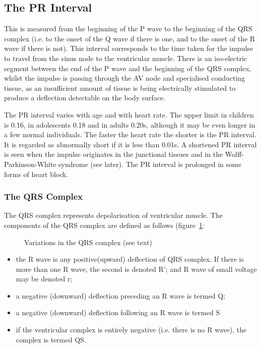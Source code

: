 \subsection{The PR Interval}
This is measured from the beginning of the P wave to the beginning of the QRS
complex (i.e. to the onset of the Q wave if there is one, and to the onset of
the R wave if there is not).  This interval corresponds to the time taken for
the impulse to travel from the sinus node to the ventricular muscle. There is an iso-electric segment
between the end of the P wave and the beginning of the QRS complex, whilst the
impulse is passing through the AV node and specialised
conducting tissue, as an insufficient amount of tissue is being electrically
stimulated to produce a deflection detectable on the body surface.

The PR interval varies with age and with heart rate. The upper limit in
children is 0.16, in adolescents 0.18 and in adults 0.20s, although it may be
even longer in a few normal individuals. The faster the heart rate the shorter
is the PR interval. It is regarded as abnormally short if it is less than
0.01s. A shortened PR interval is seen when the impulse originates in the
junctional tissues and in the Wolff-Parkinson-White syndrome (see later).
 The PR interval
is prolonged in some forms of heart block.

\subsubsection{The QRS Complex}
The QRS complex represents depolarisation of ventricular muscle. The
components of the QRS complex are defined as follows
(figure~\ref{fig:qrs}:

\begin{figure}[htbp] \centering
 \caption[Variations in the QRS complex]{Variations in the QRS complex (see text)}
  \label{fig:qrs}
\end{figure}

\begin{itemize}
 \item the R wave is any positive(upward) deflection of QRS complex. If there
  is more than one R wave, the second is denoted R'; and R wave of small
  voltage may be denoted r; 
 \item a negative (downward) deflection preceding an R wave is termed Q;
 \item a negative (downward) deflection following an R wave is termed S
 \item if the ventricular complex is entirely negative (i.e. there is no R
  wave), the complex is termed QS.
\end{itemize}

